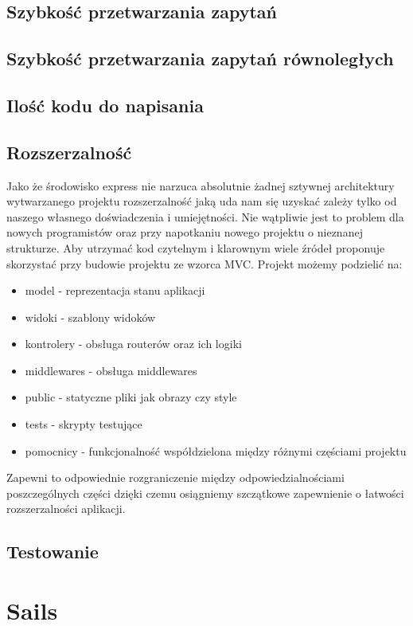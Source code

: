 \documentclass[12pt]{report}
\begin{document}
    \subsection{Szybkość przetwarzania zapytań}
    \subsection{Szybkość przetwarzania zapytań równoległych}
    \subsection{Ilość kodu do napisania}
    \subsection{Rozszerzalność}
      Jako że środowisko express nie narzuca absolutnie żadnej sztywnej architektury wytwarzanego projektu rozszerzalność jaką uda nam się uzyskać zależy tylko od naszego własnego doświadczenia i umiejętności.
      Nie wątpliwie jest to problem dla nowych programistów oraz przy napotkaniu nowego projektu o nieznanej strukturze.
      Aby utrzymać kod czytelnym i klarownym wiele źródeł proponuje skorzystać przy budowie projektu ze wzorca MVC.
      Projekt możemy podzielić na:
      \begin{itemize}
        \item model - reprezentacja stanu aplikacji
        \item widoki - szablony widoków
        \item kontrolery - obsługa routerów oraz ich logiki
        \item middlewares - obsługa middlewares
        \item public - statyczne pliki jak obrazy czy style
        \item tests - skrypty testujące
        \item pomocnicy - funkcjonalność współdzielona między różnymi częściami projektu
      \end{itemize}
      Zapewni to odpowiednie rozgraniczenie między odpowiedzialnościami poszczególnych części dzięki czemu osiągniemy szczątkowe zapewnienie o łatwości rozszerzalności aplikacji. 
      
    \subsection{Testowanie}

  \section{Sails}
\end{document}
